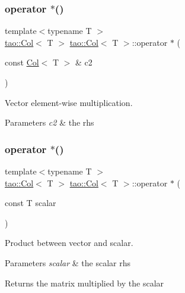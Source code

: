 \subsubsection{\texorpdfstring{operator $\ast$()}{operator *()}\hspace{0.1cm}{\footnotesize\ttfamily [1/2]}}
{\footnotesize\ttfamily template$<$typename T $>$ \\
\mbox{\hyperlink{classtao_1_1_col}{tao\+::\+Col}}$<$ T $>$ \mbox{\hyperlink{classtao_1_1_col}{tao\+::\+Col}}$<$ T $>$\+::operator $\ast$ (\begin{DoxyParamCaption}\item[{const \mbox{\hyperlink{classtao_1_1_col}{Col}}$<$ T $>$ \&}]{c2 }\end{DoxyParamCaption})}



Vector element-\/wise multiplication. 


\begin{DoxyParams}{Parameters}
{\em c2} & the rhs \\
\hline
\end{DoxyParams}
\mbox{\label{classtao_1_1_col_a734ed22497ede69a2ed0f791bd503355}} 
\subsubsection{\texorpdfstring{operator $\ast$()}{operator *()}\hspace{0.1cm}{\footnotesize\ttfamily [2/2]}}
{\footnotesize\ttfamily template$<$typename T $>$ \\
\mbox{\hyperlink{classtao_1_1_col}{tao\+::\+Col}}$<$ T $>$ \mbox{\hyperlink{classtao_1_1_col}{tao\+::\+Col}}$<$ T $>$\+::operator $\ast$ (\begin{DoxyParamCaption}\item[{const T}]{scalar }\end{DoxyParamCaption})}



Product between vector and scalar. 


\begin{DoxyParams}{Parameters}
{\em scalar} & the scalar rhs \\
\hline
\end{DoxyParams}
\begin{DoxyReturn}{Returns}
the matrix multiplied by the scalar 
\end{DoxyReturn}
\mbox{\label{classtao_1_1_col_a9274e5a0efd840c97741d05dca7bd5a2}} 
